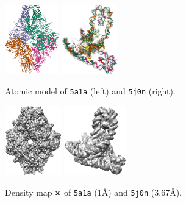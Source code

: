 \begin{figure}[ht!]
    \centering
    \begin{minipage}[b]{0.46\linewidth}
        \begin{subfigure}[b]{\linewidth}
            \centering
            \includegraphics[height=3cm]{figures/5a1a_pdb.png}
            \hspace{0.05\linewidth}
            \includegraphics[height=3cm]{figures/5j0n_pdb_.png}
            \caption{Atomic model of \texttt{5a1a} (left) and \texttt{5j0n} (right).}
            \vspace{0.5em}
        \end{subfigure}
        \begin{subfigure}[b]{\linewidth}
            \centering
            \includegraphics[height=3cm]{figures/5a1a_5A.png}
            \hspace{0.05\linewidth}
            \includegraphics[height=3cm]{figures/5j0n_5A.png}
            \caption{Density map $\mathbf{x}$ of \texttt{5a1a} (1\AA) and \texttt{5j0n} (3.67\AA).}%
            \label{fig:density-map:5j0n:ground-truth}
        \end{subfigure}
        \caption{%
}
\end{minipage}
\end{figure}
